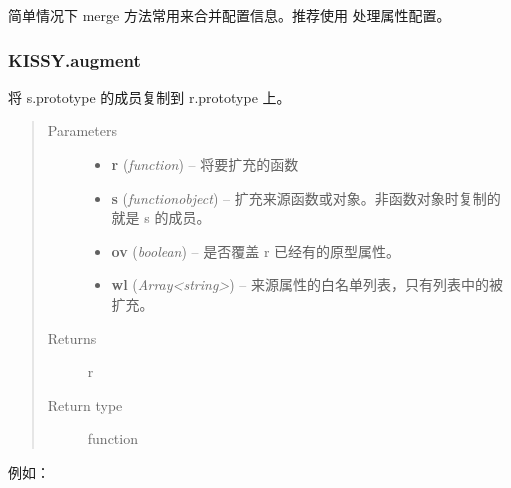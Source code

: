 \documentclass[letterpaper,10pt,english]{sphinxmanual}
\begin{document}
简单情况下 merge 方法常用来合并配置信息。推荐使用  处理属性配置。


\subsubsection{KISSY.augment}
\label{api/seed/kissy/augment:kissy-augment}\label{api/seed/kissy/augment::doc}

\begin{fulllineitems}
\label{api/seed/kissy/augment:Seed.KISSY.augment}
将 s.prototype 的成员复制到 r.prototype 上。
\begin{quote}\begin{description}
\item[{Parameters}] \leavevmode\begin{itemize}
\item {}
\textbf{r} (\emph{function}) -- 将要扩充的函数

\item {}
\textbf{s} (\emph{function\textbar{}object}) -- 扩充来源函数或对象。非函数对象时复制的就是 s 的成员。

\item {}
\textbf{ov} (\emph{boolean}) -- 是否覆盖 r 已经有的原型属性。

\item {}
\textbf{wl} (\emph{Array\textless{}string\textgreater{}}) -- 来源属性的白名单列表，只有列表中的被扩充。

\end{itemize}

\item[{Returns}] \leavevmode
r

\item[{Return type}] \leavevmode
function

\end{description}\end{quote}

\end{fulllineitems}


例如：
\end{document}
